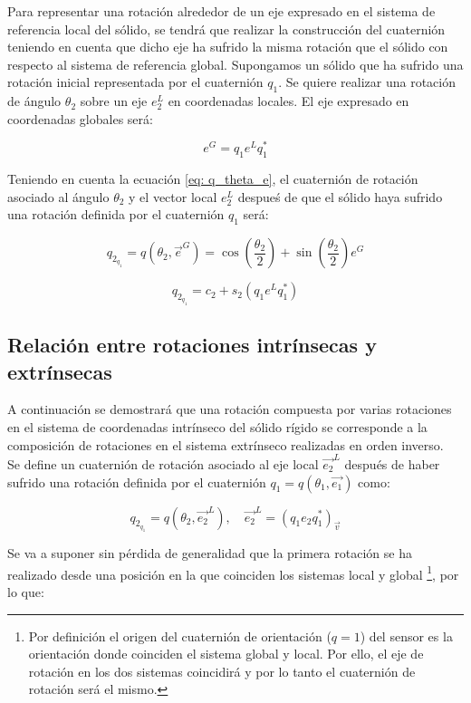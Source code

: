 \documentclass[10pt, a4paper]{report}
\begin{document}
Para representar una rotación alrededor de un eje expresado en el sistema de referencia local del sólido, se tendrá que realizar la construcción del cuaternión teniendo en cuenta que dicho eje ha sufrido la misma rotación que el sólido con respecto al sistema de referencia global. Supongamos un sólido que ha sufrido una rotación inicial representada por el cuaternión $q_1$. Se quiere realizar una rotación de ángulo $\theta_2$ sobre un eje $e_2^L$ en coordenadas locales. El eje expresado en coordenadas globales será:

$$ e^G = q_1e^Lq_1^* $$

Teniendo en cuenta la ecuación \eqref{eq: q_theta_e}, el cuaternión de rotación asociado al ángulo $\theta_2$ y el vector local $e_2^L$ despueś de que el sólido haya sufrido una rotación definida por el cuaternión $q_1$ será:

$$ q_{2_{q_1}} = q(\theta_2, \vec{e}^G) = \cos\left( \frac{\theta_2}{2}\right) + \sin\left( \frac{\theta_2}{2} \right)e^G $$

\begin{equation} \label{eq: q_2_q_1}
q_{2_{q_1}} =  c_2 + s_2(q_1e^Lq_1^*)
\end{equation} 

\subsection{Relación entre rotaciones intrínsecas y extrínsecas}

A continuación se demostrará que una rotación compuesta por varias rotaciones en el sistema de coordenadas intrínseco del sólido rígido se corresponde a la composición de rotaciones en el sistema extrínseco realizadas en orden inverso.\\

Se define un cuaternión de rotación asociado al eje local $\vec{e_2}^L$ después de haber sufrido una rotación definida por el cuaternión $q_1 = q\left( \theta_1 , \vec{e_1} \right)$ como:

\begin{equation}
q_{2_{q_1}} = q\left(\theta_2 , \vec{e_2}^L \right) , \quad \vec{e_2}^L = (q_1e_2q_1^*)_{\vec{v}}
\end{equation}

Se va a suponer sin pérdida de generalidad que la primera rotación se ha realizado desde una posición en la que coinciden los sistemas local y global  \footnote{Por definición el origen del  cuaternión de orientación ($q = 1$) del sensor es la orientación donde coinciden el sistema global y local. Por ello, el eje de rotación en los dos sistemas coincidirá y por lo tanto el cuaternión de rotación será el mismo.}, por lo que:
\end{document}
